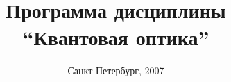 \title{Программа дисциплины \\ ``Квантовая оптика''}
\author{}
\date{Санкт-Петербург, 2007}
\maketitle
\newpage
